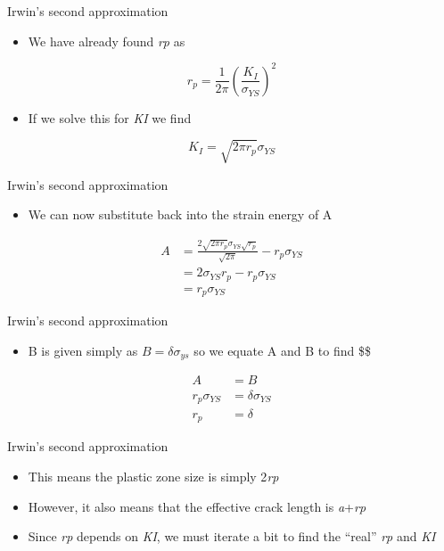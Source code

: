 \documentclass[
  letterpaper,
  ignorenonframetext,
  aspectratio=43,
  handout,
  12pt]{beamer}
\providecommand{\tightlist}{%
  \setlength{\itemsep}{0pt}\setlength{\parskip}{0pt}}
\providecommand{\tightlist}{%
\setlength{\itemsep}{0pt}\setlength{\parskip}{0pt}}
\begin{document}
\begin{frame}{Irwin's second approximation}
\protect\hypertarget{irwins-second-approximation-5}{}
\begin{itemize}
\tightlist
\item
  We have already found \emph{r}\emph{p} as
\end{itemize}

\[r_p = \frac{1}{2\pi} \left(\frac{K_I}{\sigma_{YS}}\right)^2\]

\begin{itemize}
\tightlist
\item
  If we solve this for \emph{K}\emph{I} we find
\end{itemize}

\[K_I = \sqrt{2\pi r_p} \sigma_{YS}\]
\end{frame}

\begin{frame}{Irwin's second approximation}
\protect\hypertarget{irwins-second-approximation-6}{}
\begin{itemize}
\tightlist
\item
  We can now substitute back into the strain energy of A
\end{itemize}

\[\begin{aligned}
  A &= \frac{2\sqrt{2\pi r_p} \sigma_{YS} \sqrt{r_p}}{\sqrt{2\pi}}- r_p \sigma_{YS}\\
  &= 2 \sigma_{YS} r_p- r_p \sigma_{YS}\\
  &= r_p \sigma_{YS}
\end{aligned}\]
\end{frame}

\begin{frame}{Irwin's second approximation}
\protect\hypertarget{irwins-second-approximation-7}{}
\begin{itemize}
\tightlist
\item
  B is given simply as \(B=\delta \sigma_{ys}\) so we equate A and B to
  find \$\delta\$
\end{itemize}

\[\begin{aligned}
  A &= B\\
  r_p \sigma_{YS} &= \delta \sigma_{YS}\\
  r_p &= \delta
\end{aligned}\]
\end{frame}

\begin{frame}{Irwin's second approximation}
\protect\hypertarget{irwins-second-approximation-8}{}
\begin{itemize}
\tightlist
\item
  This means the plastic zone size is simply 2\emph{r}\emph{p}
\item
  However, it also means that the effective crack length is
  \emph{a}+\emph{r}\emph{p}
\item
  Since \emph{r}\emph{p} depends on \emph{K}\emph{I}, we must iterate a
  bit to find the ``real'' \emph{r}\emph{p} and \emph{K}\emph{I}
\end{itemize}
\end{frame}
\end{document}

